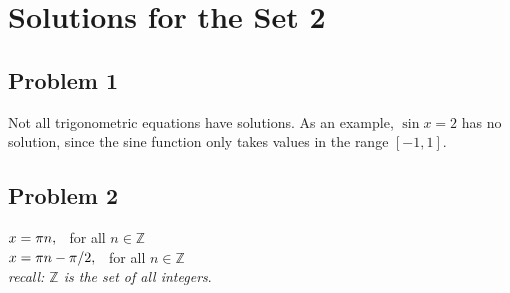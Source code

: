 \documentclass[12pt]{article}
\begin{document}
\section*{Solutions for the Set 2}
\subsection*{Problem 1}
Not all trigonometric equations have solutions. As an example, \(\sin x =2\) has no solution, since the sine function only takes values in the range \([-1,1]\).

\subsection*{Problem 2}
\(x=\pi n, \hspace{0.2cm} \) for all \(n \in \mathbb{Z}\)\\
\(x=\pi n-\pi/2, \hspace{0.2cm}\) for all \(n \in \mathbb{Z}\)\\
\textit{recall: \(\mathbb{Z}\) is the set of all integers}.
\end{document}
